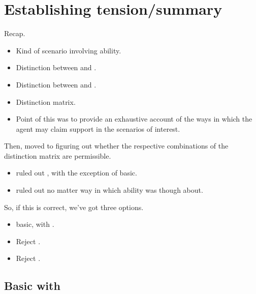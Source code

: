 \chapter{Establishing tension/summary}
\label{sec:establishing-tension}

\begin{note}
  Recap.

  \begin{itemize}
  \item Kind of scenario involving ability.
  \item Distinction between \AR{} and \WR{}.
  \item Distinction between \adA{} and \adB{}.
  \item Distinction matrix.
  \item Point of this was to provide an exhaustive account of the ways in which the agent may claim support in the scenarios of interest.
  \end{itemize}

  Then, moved to figuring out whether the respective combinations of the distinction matrix are permissible.
  \begin{itemize}
  \item \ESU{} ruled out \adB{}, with the exception of \AR{} basic.
  \item \nI{} ruled out \adA{} no matter way in which ability was though about.
  \end{itemize}

  So, if this is correct, we've got three options.
  \begin{itemize}
  \item \AR{} basic, with \adB{}.
  \item Reject \nI{}.
  \item Reject \ESU{}.
  \end{itemize}
\end{note}

\begin{note}[Matrix]
  \begin{figure}[H]
    \centering
    \saMtxRuledOut{}
  \end{figure}
\end{note}

\section{\AR{} Basic with \adB{}}
\label{sec:ar-basic-with}

